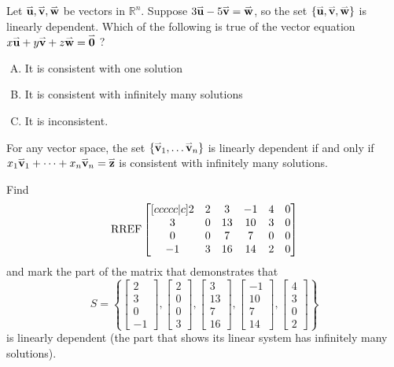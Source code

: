 \begin{activity}{10}
  Let \(\mathbf{\accentset{\rightharpoonup}{u}},\mathbf{\accentset{\rightharpoonup}{v}},\mathbf{\accentset{\rightharpoonup}{w}}\) be vectors in \(\mathbb R^n\).
  Suppose \(3\mathbf{\accentset{\rightharpoonup}{u}}-5\mathbf{\accentset{\rightharpoonup}{v}}=\mathbf{\accentset{\rightharpoonup}{w}}\), so the set
  \(\{\mathbf{\accentset{\rightharpoonup}{u}},\mathbf{\accentset{\rightharpoonup}{v}},\mathbf{\accentset{\rightharpoonup}{w}}\}\) is linearly dependent.
  Which of the following is true of the vector equation \(x\mathbf{\accentset{\rightharpoonup}{u}}+y\mathbf{\accentset{\rightharpoonup}{v}}+z\mathbf{\accentset{\rightharpoonup}{w}}=\mathbf{\accentset{\rightharpoonup}{0}}\) ?
  \begin{enumerate}[(A)]
  \item It is consistent with one solution
  \item It is consistent with infinitely many solutions
  \item It is inconsistent.
  \end{enumerate}
\end{activity}

\begin{fact}
  For any vector space,
  the set \(\{\mathbf{\accentset{\rightharpoonup}{v}}_1,\dots\mathbf{\accentset{\rightharpoonup}{v}}_n\}\) is linearly dependent if and only
  if \(x_1\mathbf{\accentset{\rightharpoonup}{v}}_1+\dots+x_n\mathbf{\accentset{\rightharpoonup}{v}}_n=\mathbf{\accentset{\rightharpoonup}{z}}\) is consistent with
  infinitely many solutions.
\end{fact}

\begin{activity}{10}
  Find
  \[\operatorname{RREF}\begin{bmatrix}[ccccc|c]
  2&2&3&-1&4&0\\
  3&0&13&10&3&0\\
  0&0&7&7&0&0\\
  -1&3&16&14&2&0
  \end{bmatrix}
  \]
  and mark the part of the matrix that demonstrates that
  \[S=\left\{
  \begin{bmatrix}2\\3\\0\\-1\end{bmatrix},
  \begin{bmatrix}2\\0\\0\\3\end{bmatrix},
  \begin{bmatrix}3\\13\\7\\16\end{bmatrix},
  \begin{bmatrix}-1\\10\\7\\14\end{bmatrix},
  \begin{bmatrix}4\\3\\0\\2\end{bmatrix}
  \right\}
  \]
  is linearly dependent (the part that shows its linear system has
  infinitely many solutions).
\end{activity}

